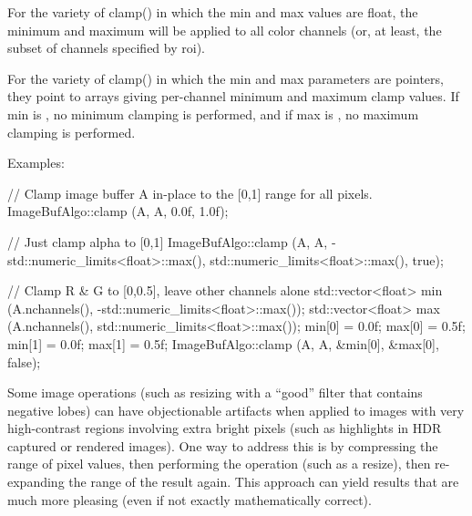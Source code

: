 For the variety of {\cf clamp()} in which the {\cf min} and {\cf max}
values are {\cf float}, the minimum and maximum will be applied to
all color channels (or, at least, the subset of channels specified by
{\cf roi}).

For the variety of {\cf clamp()} in which the {\cf min} and {\cf max}
parameters are pointers, they point to arrays giving per-channel minimum
and maximum clamp values.  If {\cf min} is \NULL, no minimum clamping is
performed, and if {\cf max} is \NULL, no maximum clamping is performed.

\smallskip
\noindent Examples:
\begin{code}
    // Clamp image buffer A in-place to the [0,1] range for all pixels.
    ImageBufAlgo::clamp (A, A, 0.0f, 1.0f);

    // Just clamp alpha to [0,1]
    ImageBufAlgo::clamp (A, A, -std::numeric_limits<float>::max(),
                         std::numeric_limits<float>::max(), true);

    // Clamp R & G to [0,0.5], leave other channels alone
    std::vector<float> min (A.nchannels(), -std::numeric_limits<float>::max());
    std::vector<float> max (A.nchannels(), std::numeric_limits<float>::max());
    min[0] = 0.0f;  max[0] = 0.5f;
    min[1] = 0.0f;  max[1] = 0.5f;
    ImageBufAlgo::clamp (A, A, &min[0], &max[0], false);
\end{code}
\apiend


 
 

Some image operations (such as resizing with a ``good'' filter that
contains negative lobes) can have objectionable artifacts when applied
to images with very high-contrast regions involving extra bright pixels
(such as highlights in HDR captured or rendered images).  One way to
address this is by compressing the range of pixel values, then
performing the operation (such as a resize), then re-expanding the range
of the result again.  This approach can yield results that are much more
pleasing (even if not exactly mathematically correct).

